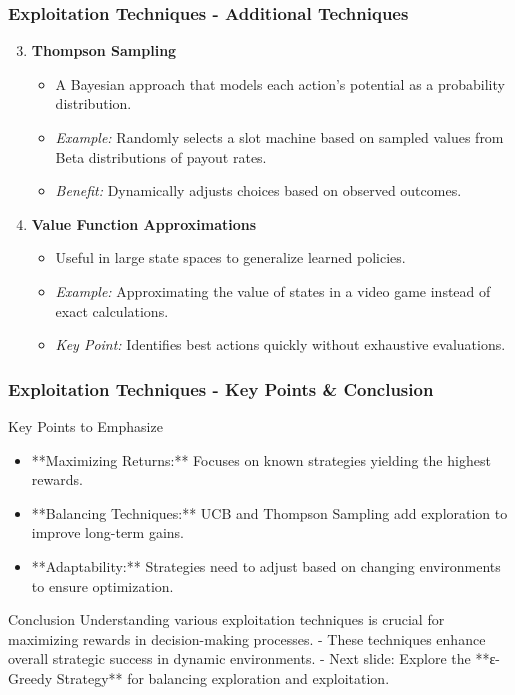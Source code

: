 \documentclass[aspectratio=169]{beamer}
\begin{document}
\begin{frame}[fragile]
    \frametitle{Exploitation Techniques - Additional Techniques}
    \begin{enumerate}
        \setcounter{enumi}{2} %
        \item \textbf{Thompson Sampling}
            \begin{itemize}
                \item A Bayesian approach that models each action's potential as a probability distribution.
                \item \textit{Example:} Randomly selects a slot machine based on sampled values from Beta distributions of payout rates.
                \item \textit{Benefit:} Dynamically adjusts choices based on observed outcomes.
            \end{itemize}

        \item \textbf{Value Function Approximations}
            \begin{itemize}
                \item Useful in large state spaces to generalize learned policies.
                \item \textit{Example:} Approximating the value of states in a video game instead of exact calculations.
                \item \textit{Key Point:} Identifies best actions quickly without exhaustive evaluations.
            \end{itemize}
    \end{enumerate}
\end{frame}

\begin{frame}[fragile]
    \frametitle{Exploitation Techniques - Key Points & Conclusion}
    \begin{block}{Key Points to Emphasize}
        \begin{itemize}
            \item **Maximizing Returns:** Focuses on known strategies yielding the highest rewards.
            \item **Balancing Techniques:** UCB and Thompson Sampling add exploration to improve long-term gains.
            \item **Adaptability:** Strategies need to adjust based on changing environments to ensure optimization.
        \end{itemize}
    \end{block}

    \begin{block}{Conclusion}
        Understanding various exploitation techniques is crucial for maximizing rewards in decision-making processes.
        - These techniques enhance overall strategic success in dynamic environments.
        - Next slide: Explore the **ε-Greedy Strategy** for balancing exploration and exploitation.
    \end{block}
\end{frame}
\end{document}
